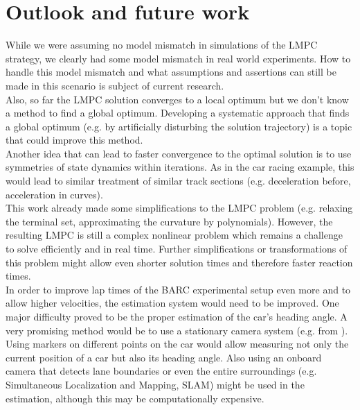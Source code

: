 \section{Outlook and future work}
While we were assuming no model mismatch in simulations of the LMPC strategy, we clearly had some model mismatch in real world experiments. How to handle this model mismatch and what assumptions and assertions can still be made in this scenario is subject of current research.\\
Also, so far the LMPC solution converges to a local optimum but we don't know a method to find a global optimum. Developing a systematic approach that finds a global optimum (e.g. by artificially disturbing the solution trajectory) is a topic that could improve this method.\\
Another idea that can lead to faster convergence to the optimal solution is to use symmetries of state dynamics within iterations. As in the car racing example, this would lead to similar treatment of similar track sections (e.g. deceleration before, acceleration in curves).\\
This work already made some simplifications to the LMPC problem (e.g. relaxing the terminal set, approximating the curvature by polynomials). However, the resulting LMPC is still a complex nonlinear problem which remains a challenge to solve efficiently and in real time. Further simplifications or transformations of this problem might allow even shorter solution times and therefore faster reaction times.\\
In order to improve lap times of the BARC experimental setup even more and to allow higher velocities, the estimation system would need to be improved. One major difficulty proved to be the proper estimation of the car's heading angle. A very promising method would be to use a stationary camera system (e.g. from \cite{Liniger2015}). Using markers on different points on the car would allow measuring not only the current position of a car but also its heading angle. Also using an onboard camera that detects lane boundaries or even the entire surroundings (e.g. Simultaneous Localization and Mapping, SLAM) might be used in the estimation, although this may be computationally expensive.\\

